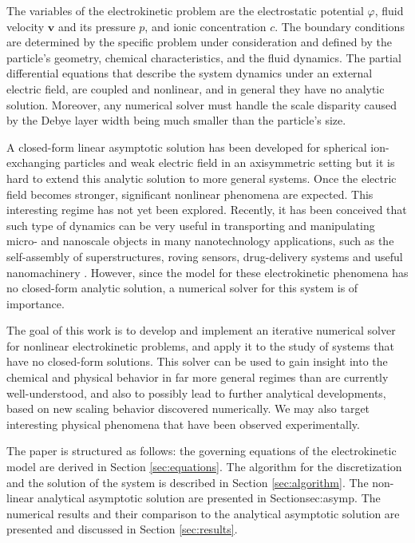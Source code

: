 \documentclass[final]{elsarticle}
\newcommand\bv{\boldsymbol{v}}
\begin{document}
The variables of the electrokinetic problem are the electrostatic
potential $\varphi$, fluid velocity $\bv$ and its pressure $p$, and
ionic concentration $c$.
The boundary conditions are determined by the specific
problem under consideration and defined by the particle's
geometry, chemical characteristics, and the fluid dynamics.
The partial differential equations that describe the system dynamics
under an external electric field, are coupled and nonlinear, and
in general they have no analytic solution. 
Moreover, any numerical solver must handle the scale disparity caused by the
Debye layer width being much smaller than the particle's size. 

A closed-form linear asymptotic solution has been developed for
spherical ion-exchanging particles and weak electric field in an
axisymmetric setting \cite{yariv2010migration} but it is hard to extend this
analytic solution to more general systems. Once the electric field
becomes stronger, significant nonlinear phenomena are expected.
This interesting regime has not yet been explored.
Recently, it has been conceived that such type of dynamics
can be very useful in transporting and manipulating micro-
and nanoscale objects in many nanotechnology applications,
such as the self-assembly of superstructures, roving sensors, 
drug-delivery systems and useful nanomachinery 
\cite{howse2007self,paxton2004catalytic,pumera2010electrochemically}.
However, since the model for these electrokinetic
phenomena has no closed-form analytic solution, a numerical
solver for this system is of importance.

The goal of this work is to develop and implement an iterative numerical
solver for nonlinear electrokinetic problems, and apply it to the study
of systems that have no closed-form solutions.
This solver can be used to gain insight into the chemical and physical behavior 
in far more general regimes than are currently well-understood, 
and also to possibly lead to further analytical developments, based on new scaling behavior
discovered numerically. We may also target interesting physical
phenomena that have been observed experimentally.

The paper is structured as follows: the governing equations of the electrokinetic model
are derived in Section \ref{sec:equations}. The algorithm for the discretization and 
the solution of the system is described in Section \ref{sec:algorithm}.
The non-linear analytical asymptotic solution are presented in Section{sec:asymp}.
The numerical results and their comparison to the analytical asymptotic solution 
are presented and discussed in Section \ref{sec:results}. 
\end{document}
